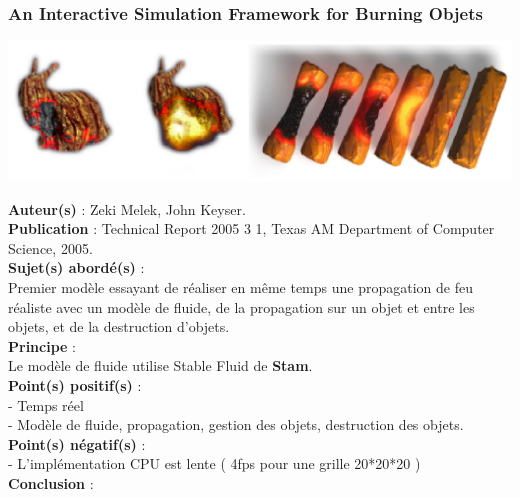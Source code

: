 \documentclass[a4paper,10pt]{article}
\begin{document}
\subsubsection{An Interactive Simulation Framework for Burning Objets}
    \begin{center}
	\includegraphics[scale=0.5]{Interactive.ps}
    \end{center}
\textbf{Auteur(s)} : Zeki Melek, John Keyser.\\
\textbf{Publication} : Technical Report 2005 3 1, Texas AM Department of Computer Science, 2005. \\
\textbf{Sujet(s) abordé(s)} : \\
Premier modèle essayant de réaliser en même temps une propagation
de feu réaliste avec un modèle de fluide, de la propagation sur un objet et entre les objets, et de la destruction
d'objets.\\
\textbf{Principe} :\\	
Le modèle de fluide utilise Stable Fluid de \textbf{Stam}. \\
\textbf{Point(s) positif(s)} :\\
    - Temps réel\\
    - Modèle de fluide, propagation, gestion des objets, destruction des objets.\\
\textbf{Point(s) négatif(s)} :\\
    - L'implémentation CPU est lente ( 4fps pour une grille 20*20*20 )\\      
\textbf{Conclusion} :\\
\end{document}
